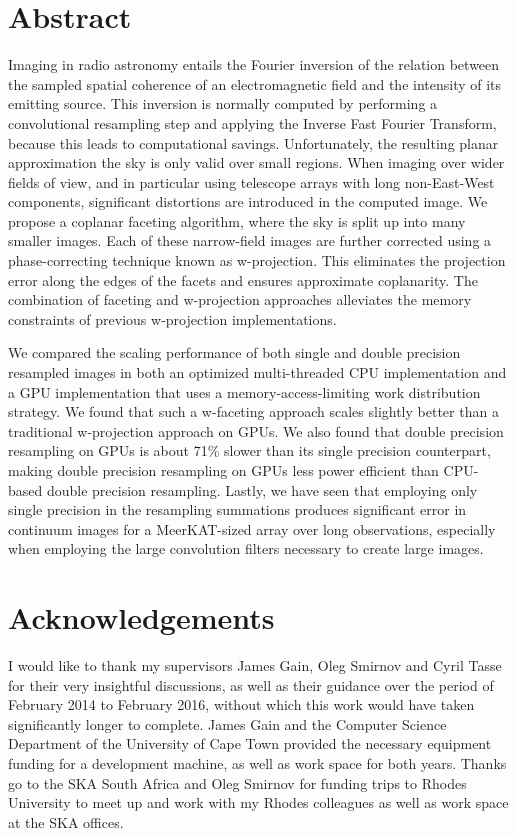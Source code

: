 \chapter*{Abstract}
 Imaging in radio astronomy entails the Fourier inversion of the relation between the sampled spatial coherence of an electromagnetic field and the intensity of its 
 emitting source. This inversion is normally computed by performing a convolutional resampling step and applying 
 the Inverse Fast Fourier Transform, because this leads to computational savings. Unfortunately, the resulting planar approximation the sky is only valid over small regions. When imaging 
 over wider fields of view, and in particular using telescope arrays with long non-East-West components, significant distortions are introduced in the computed image. We propose a coplanar 
 faceting algorithm, where the sky is split up into many smaller images. Each of these narrow-field images are further corrected using a phase-correcting technique known as w-projection. 
 This eliminates the projection error along the edges of the facets and ensures approximate coplanarity. The combination of faceting and w-projection approaches 
 alleviates the memory constraints of previous w-projection implementations. 
 
 We compared the scaling performance of both single and double precision resampled images in both an optimized multi-threaded CPU implementation and a GPU implementation that uses a 
 memory-access-limiting work distribution strategy. We found that such a w-faceting approach scales slightly better than a traditional w-projection approach on GPUs. We also found that
 double precision resampling on GPUs is about 71\% slower than its single precision counterpart, making double precision resampling on GPUs less power efficient than CPU-based double 
 precision resampling. Lastly, we have seen that employing only single precision in the resampling summations produces significant error in continuum images for a MeerKAT-sized 
 array over long observations, especially when employing the large convolution filters necessary to create large images.
 
\chapter*{Acknowledgements}
 I would like to thank my supervisors James Gain, Oleg Smirnov and Cyril Tasse for their very insightful discussions, as well as 
 their guidance over the period of February 2014 to February 2016, without which this work would have taken significantly longer 
 to complete. James Gain and the Computer Science Department of the University of Cape Town provided the necessary equipment funding for a 
 development machine, as well as work space for both years. Thanks go to the SKA South Africa and Oleg Smirnov for funding 
 trips to Rhodes University to meet up and work with my Rhodes colleagues as well as work space at the SKA offices.
 
